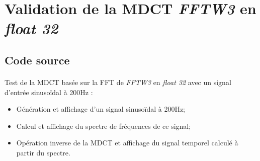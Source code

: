\documentclass{article}
\begin{document}

\newpage
\section{Validation de la MDCT \emph{FFTW3} en \emph{float 32}}\label{app:fftw3_example}
\subsection{Code source}\label{app:fftw3_example_code}
\paragraph{}
Test de la MDCT basée sur la FFT de \emph{FFTW3} en \emph{float 32} avec un signal d'entrée sinusoïdal à 200Hz :
\begin{itemize}
    \item Génération et affichage d'un signal sinusoïdal à 200Hz;
    \item Calcul et affichage du spectre de fréquences de ce signal;
    \item Opération inverse de la MDCT et affichage du signal temporel calculé à partir du spectre.
\end{itemize}
\end{document}
